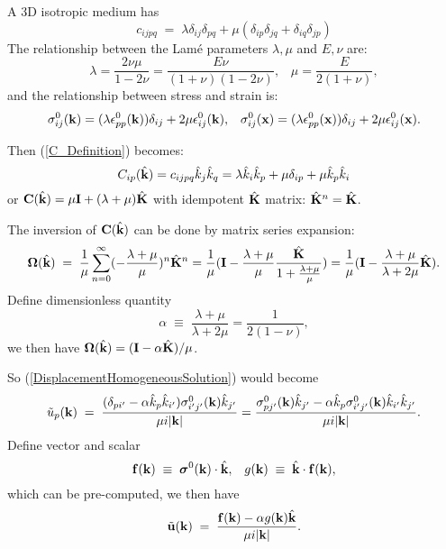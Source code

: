 \documentclass[12pt]{article}
\def\bmath#1{\mbox{\boldmath$#1$}}
\begin{document}
A 3D isotropic medium has 
\begin{equation}
 c_{ijpq} \;=\; \lambda \delta_{ij}\delta_{pq} + 
\mu(\delta_{ip}\delta_{jq}+\delta_{iq}\delta_{jp})
\end{equation}
The relationship between the Lam\'{e} parameters $\lambda,\mu$ and $E,\nu$ are:
\begin{equation}
 \lambda = \frac{2\nu\mu}{1-2\nu} = \frac{E\nu}{(1+\nu)(1-2\nu)}, \;\;\;
 \mu = \frac{E}{2(1+\nu)},
\end{equation}
and the relationship between stress and strain is:
\begin{equation}
 \sigma^0_{ij}({\bf k}) = (\lambda\epsilon^0_{pp}({\bf k}))\delta_{ij} 
                            + 2\mu\epsilon^0_{ij}({\bf k}), \;\;\;
 \sigma^0_{ij}({\bf x}) = (\lambda\epsilon^0_{pp}({\bf x}))\delta_{ij} 
                            + 2\mu\epsilon^0_{ij}({\bf x}).
\end{equation}

Then (\ref{C_Definition}) becomes:
\begin{equation}
 C_{ip}(\hat{\bf k}) = c_{ijpq} \hat{k}_j\hat{k}_q = 
\lambda \hat{k}_i \hat{k}_p + \mu \delta_{ip} + \mu \hat{k}_p\hat{k}_i 
\end{equation}
or ${\bf C}(\hat{\bf k})=\mu{\bf I}+(\lambda+\mu) \hat{\bf K}$ with
idempotent $\hat{\bf K}$ matrix:  $\hat{\bf K}^n=\hat{\bf K}$.

The inversion of ${\bf C}(\hat{\bf k})$ can be done by matrix series expansion:
\begin{equation}
 {\bf \Omega}(\hat{\bf k}) \;=\; 
\frac{1}{\mu}\sum_{n=0}^\infty (-\frac{\lambda+\mu}{\mu})^n \hat{\bf K}^n 
= \frac{1}{\mu} ( {\bf I} - \frac{\lambda+\mu}{\mu} \frac{\hat{\bf K}}{1+\frac{\lambda+\mu}{\mu}} ) 
= \frac{1}{\mu} ( {\bf I} - \frac{\lambda+\mu}{\lambda+2\mu}\hat{\bf K} ).
\end{equation}
Define dimensionless quantity
\begin{equation}
 \alpha \;\equiv\; \frac{\lambda+\mu}{\lambda+2\mu} = \frac{1}{2(1-\nu)},
\end{equation}
we then have ${\bf \Omega}(\hat{\bf k}) = ({\bf I} - \alpha\hat{\bf K})/\mu$.

So (\ref{DisplacementHomogeneousSolution}) would become
\begin{equation}
 \tilde{u}_p({\bf k}) \;=\; 
 \frac{(\delta_{pi'}-\alpha\hat{k}_p\hat{k}_{i'})\sigma^0_{i'j'}({\bf k}) \hat{k}_{j'}}
 {\mu i|{\bf k}|} = \frac{\sigma^0_{pj'}({\bf k}) \hat{k}_{j'} - 
 \alpha\hat{k}_p\sigma^0_{i'j'}({\bf k})\hat{k}_{i'}\hat{k}_{j'}}
 {\mu i|{\bf k}|}.
\end{equation}
Define vector and scalar 
\begin{equation}
 {\bf f}({\bf k}) \;\equiv\; \bmath{\sigma}^0({\bf k})\cdot \hat{\bf k}, \;\;\;
 g({\bf k}) \;\equiv\; \hat{\bf k}\cdot {\bf f}({\bf k}),
\end{equation}
which can be pre-computed, we then have
\begin{equation}
 \tilde{\bf u}({\bf k}) \;=\; \frac{{\bf f}({\bf k}) - \alpha g({\bf k})\hat{\bf k}}{\mu i|{\bf k}|}.
\end{equation}
\end{document}
